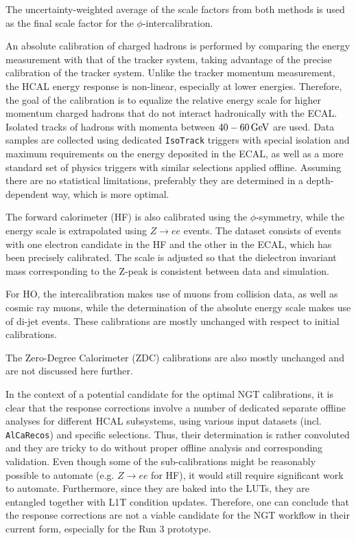 The uncertainty-weighted average of the scale factors from both methods is used as the final scale factor for the $\phi$-intercalibration.

An absolute calibration of charged hadrons is performed by comparing the energy measurement with that of the tracker system, taking advantage of the precise calibration of the tracker system. Unlike the tracker momentum measurement, the HCAL energy response is non-linear, especially at lower energies. Therefore, the goal of the calibration is to equalize the relative energy scale for higher momentum charged hadrons that do not interact hadronically with the ECAL. Isolated tracks of hadrons with momenta between $40-60 \,\text{Ge\hspace{-.08em}V}$ are used. Data samples are collected using dedicated \texttt{IsoTrack} triggers with special isolation and maximum requirements on the energy deposited in the ECAL, as well as a more standard set of physics triggers with similar selections applied offline. Assuming there are no statistical limitations, preferably they are determined in a depth-dependent way, which is more optimal.

The forward calorimeter (HF) is also calibrated using the $\phi$-symmetry, while the energy scale is extrapolated using $Z \rightarrow ee$ events. The dataset consists of events with one electron candidate in the HF and the other in the ECAL, which has been precisely calibrated. The scale is adjusted so that the dielectron invariant mass corresponding to the Z-peak is consistent between data and simulation.

For HO, the intercalibration makes use of muons from collision data, as well as cosmic ray muons, while the determination of the absolute energy scale makes use of di-jet events. These calibrations are mostly unchanged with respect to initial calibrations.

The Zero-Degree Calorimeter (ZDC) calibrations are also mostly unchanged and are not discussed here further. 

In the context of a potential candidate for the optimal NGT calibrations, it is clear that the response corrections involve a number of dedicated separate offline analyses for different HCAL subsystems, using various input datasets (incl. \texttt{AlCaRecos}) and specific selections. Thus, their determination is rather convoluted and they are tricky to do without proper offline analysis and corresponding validation. Even though some of the sub-calibrations might be reasonably possible to automate (e.g. $Z \rightarrow ee$ for HF), it would still require significant work to automate. Furthermore, since they are baked into the LUTs, they are entangled together with L1T condition updates. Therefore, one can conclude that the response corrections are not a viable candidate for the NGT workflow in their current form, especially for the Run 3 prototype.

